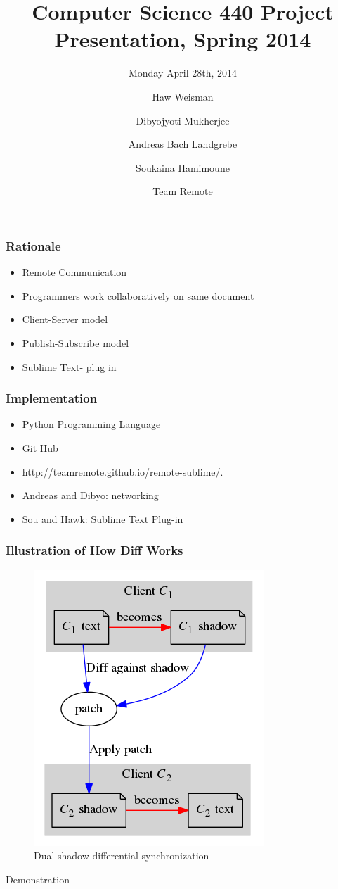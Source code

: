 \documentclass{beamer}
\title[Crisis] %
{Computer Science 440 Project Presentation, Spring 2014}
\subtitle{Monday April 28th, 2014}
\author[Hawk Weisman, Dibyojyoti Mukherjee, Andreas Bach Landgrebe, Soukaina Hamimoune] %
{Haw Weisman\inst{1} \and Dibyojyoti Mukherjee\inst{1}\\ \and Andreas Bach Landgrebe\inst{1} \and Soukaina Hamimoune\inst{2}}
\institute[Allegheny College, Department of Computer Science] %
{
  \inst{1}%
  Allgheny College\\
  Department of Computer Science
  \and
  \inst{2}%
  Al Akhawayn University\\
  Department of Computer Science
}
\date[April 28, 2014] %
{Team Remote}
\begin{document}
\frame{\titlepage}

\begin{frame}
\frametitle{Rationale}
\begin{itemize}
\item Remote Communication
\item Programmers work collaboratively on same document
\item Client-Server model
\item Publish-Subscribe model
\item Sublime Text- plug in
\end{itemize}
\end{frame}
\begin{frame}
\frametitle{Implementation}
\begin{itemize}
\item Python Programming Language
\item Git Hub
\item \url{http://teamremote.github.io/remote-sublime/}.
\item Andreas and Dibyo: networking
\item Sou and Hawk: Sublime Text Plug-in
\end{itemize}
\end{frame}
\begin{frame}
\frametitle{Illustration of How Diff Works}
	\begin{figure}
		\centering
		\includegraphics[width=0.5\linewidth]{diffsync.png}
		\caption{Dual-shadow differential synchronization}
		\label{fig:diffsync}
	\end{figure}
\end{frame}


\begin{frame}
\begin{center}
\Huge Demonstration
\end{center}
\end{frame}
\end{document}
